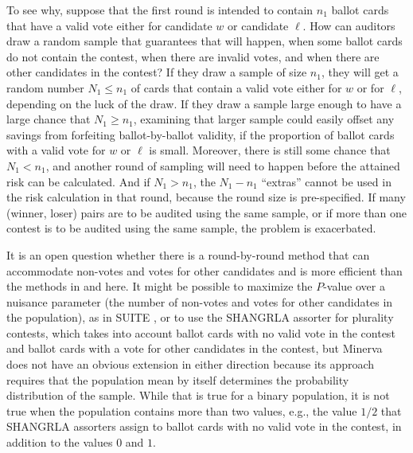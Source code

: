 \documentclass[12pt,runningheads]{llncs}
\begin{document}
{To see why, suppose that the first round is intended to contain $n_1$ ballot cards that have a valid vote either
for candidate $w$ or candidate $\ell$.  
How can auditors draw a random sample that guarantees that will happen, when some ballot cards do not contain
the contest, when there are invalid votes, and when there are other candidates in the contest?
If they draw a sample of size $n_1$, they will get a random number $N_1 \le n_1$ of cards that contain a valid vote either
for $w$ or for $\ell$, depending on the luck of the draw.
If they draw a sample large enough to have a large chance that $N_1 \ge n_1$, examining that larger sample could easily 
offset any savings from forfeiting ballot-by-ballot validity, if the proportion of ballot cards with a valid vote for $w$ or $\ell$ is
small.
Moreover, there is still some chance that $N_1 < n_1$, and another round of sampling will need to happen before the attained risk can be calculated.
And if $N_1 > n_1$, the $N_1-n_1$ ``extras'' cannot be used in the risk calculation in that round, because the round size is pre-specified.
If many (winner, loser) pairs are to be audited using the same sample, or if more than one contest is to be audited
using the same sample, the problem is exacerbated.

It is an open question whether there is a round-by-round method that can accommodate non-votes and votes
for other candidates and is more efficient than the methods in \cite{waudby-smithEtal21,stark20} and here.
It might be possible to maximize the $P$-value over a nuisance parameter (the number of non-votes and votes
for other candidates in the population), as in SUITE \cite{ottoboniEtal18}, or to use the SHANGRLA assorter
for plurality contests, which takes into account ballot cards with no valid vote in the contest and ballot cards with
a vote for other candidates in the contest, but Minerva does not have an obvious extension in either direction
because its approach requires that the population mean by itself determines the probability distribution of
the sample.
While that is true for a binary population, it is not true when the population contains more than two values, e.g., the value $1/2$ that
SHANGRLA assorters assign to ballot cards with no valid vote in the contest, in addition to the values $0$ and $1$.

}
\end{document}
